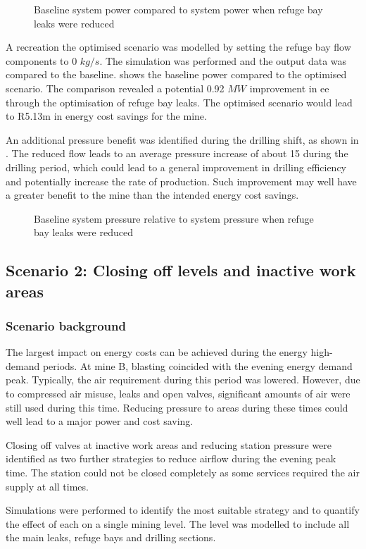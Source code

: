 	\par 
	\begin{figure}[h!]
		\centering
		
		\caption{Baseline system power compared to system power when refuge bay leaks were reduced}
		\label{fig: RefugeBay Power.}
	\end{figure} 
	A recreation the optimised scenario was modelled by setting the refuge bay flow components to 0 $kg/s$. The simulation was performed and the output data was compared to the baseline.  shows the baseline power compared to the optimised scenario. The comparison revealed a potential 0.92 $MW$ improvement in \gls{ee} through the optimisation of refuge bay leaks. The optimised scenario would lead to R5.13m in energy cost savings for the mine.
	\par
	An additional pressure benefit was identified during the drilling shift, as shown in . The reduced flow leads to an average pressure increase of about 15  during the drilling period, which could lead to a general improvement in drilling efficiency and potentially increase the rate of production. Such improvement may well have a greater benefit to the mine than the intended energy cost savings.
	\begin{figure}[h!]
		\centering
		
		\caption{Baseline system pressure relative to system pressure when refuge bay leaks were reduced}
		\label{fig: RefugeBay Pressures.}
	\end{figure} 
	\subsection{Scenario 2: Closing off levels and inactive work areas}
	\subsubsection{Scenario background}
	The largest impact on energy costs can be achieved during the energy high-demand periods. At mine B, blasting coincided with the evening energy demand peak. Typically, the air requirement during this period was lowered. However, due to compressed air misuse, leaks and open valves, significant amounts of air were still used during this time. Reducing pressure to areas during these times could well lead to a major power and cost saving. 
	\par 
	Closing off valves at inactive work areas and reducing station pressure were identified as two further strategies to reduce airflow during the evening peak time. The station could not be closed completely as some services required the air supply at all times. 
	\par 
	Simulations were performed to identify the most suitable strategy and to quantify the effect of each on a single mining level. The level was modelled to include all the main leaks, refuge bays and drilling sections.  
